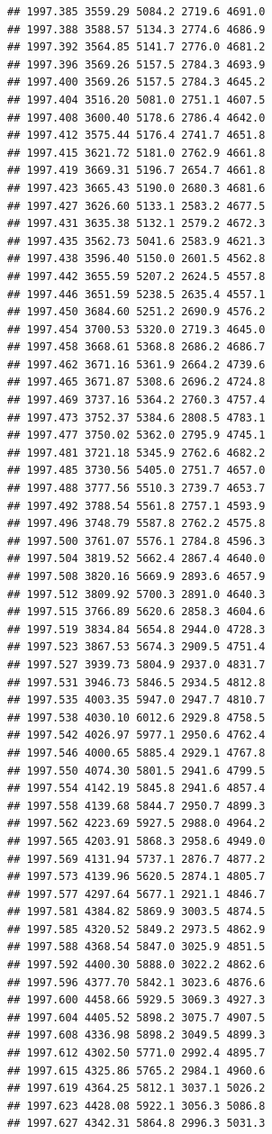 \documentclass[
]{book}
\begin{document}
\begin{verbatim}
## 1997.385 3559.29 5084.2 2719.6 4691.0
## 1997.388 3588.57 5134.3 2774.6 4686.9
## 1997.392 3564.85 5141.7 2776.0 4681.2
## 1997.396 3569.26 5157.5 2784.3 4693.9
## 1997.400 3569.26 5157.5 2784.3 4645.2
## 1997.404 3516.20 5081.0 2751.1 4607.5
## 1997.408 3600.40 5178.6 2786.4 4642.0
## 1997.412 3575.44 5176.4 2741.7 4651.8
## 1997.415 3621.72 5181.0 2762.9 4661.8
## 1997.419 3669.31 5196.7 2654.7 4661.8
## 1997.423 3665.43 5190.0 2680.3 4681.6
## 1997.427 3626.60 5133.1 2583.2 4677.5
## 1997.431 3635.38 5132.1 2579.2 4672.3
## 1997.435 3562.73 5041.6 2583.9 4621.3
## 1997.438 3596.40 5150.0 2601.5 4562.8
## 1997.442 3655.59 5207.2 2624.5 4557.8
## 1997.446 3651.59 5238.5 2635.4 4557.1
## 1997.450 3684.60 5251.2 2690.9 4576.2
## 1997.454 3700.53 5320.0 2719.3 4645.0
## 1997.458 3668.61 5368.8 2686.2 4686.7
## 1997.462 3671.16 5361.9 2664.2 4739.6
## 1997.465 3671.87 5308.6 2696.2 4724.8
## 1997.469 3737.16 5364.2 2760.3 4757.4
## 1997.473 3752.37 5384.6 2808.5 4783.1
## 1997.477 3750.02 5362.0 2795.9 4745.1
## 1997.481 3721.18 5345.9 2762.6 4682.2
## 1997.485 3730.56 5405.0 2751.7 4657.0
## 1997.488 3777.56 5510.3 2739.7 4653.7
## 1997.492 3788.54 5561.8 2757.1 4593.9
## 1997.496 3748.79 5587.8 2762.2 4575.8
## 1997.500 3761.07 5576.1 2784.8 4596.3
## 1997.504 3819.52 5662.4 2867.4 4640.0
## 1997.508 3820.16 5669.9 2893.6 4657.9
## 1997.512 3809.92 5700.3 2891.0 4640.3
## 1997.515 3766.89 5620.6 2858.3 4604.6
## 1997.519 3834.84 5654.8 2944.0 4728.3
## 1997.523 3867.53 5674.3 2909.5 4751.4
## 1997.527 3939.73 5804.9 2937.0 4831.7
## 1997.531 3946.73 5846.5 2934.5 4812.8
## 1997.535 4003.35 5947.0 2947.7 4810.7
## 1997.538 4030.10 6012.6 2929.8 4758.5
## 1997.542 4026.97 5977.1 2950.6 4762.4
## 1997.546 4000.65 5885.4 2929.1 4767.8
## 1997.550 4074.30 5801.5 2941.6 4799.5
## 1997.554 4142.19 5845.8 2941.6 4857.4
## 1997.558 4139.68 5844.7 2950.7 4899.3
## 1997.562 4223.69 5927.5 2988.0 4964.2
## 1997.565 4203.91 5868.3 2958.6 4949.0
## 1997.569 4131.94 5737.1 2876.7 4877.2
## 1997.573 4139.96 5620.5 2874.1 4805.7
## 1997.577 4297.64 5677.1 2921.1 4846.7
## 1997.581 4384.82 5869.9 3003.5 4874.5
## 1997.585 4320.52 5849.2 2973.5 4862.9
## 1997.588 4368.54 5847.0 3025.9 4851.5
## 1997.592 4400.30 5888.0 3022.2 4862.6
## 1997.596 4377.70 5842.1 3023.6 4876.6
## 1997.600 4458.66 5929.5 3069.3 4927.3
## 1997.604 4405.52 5898.2 3075.7 4907.5
## 1997.608 4336.98 5898.2 3049.5 4899.3
## 1997.612 4302.50 5771.0 2992.4 4895.7
## 1997.615 4325.86 5765.2 2984.1 4960.6
## 1997.619 4364.25 5812.1 3037.1 5026.2
## 1997.623 4428.08 5922.1 3056.3 5086.8
## 1997.627 4342.31 5864.8 2996.3 5031.3

\end{verbatim}
\end{document}

